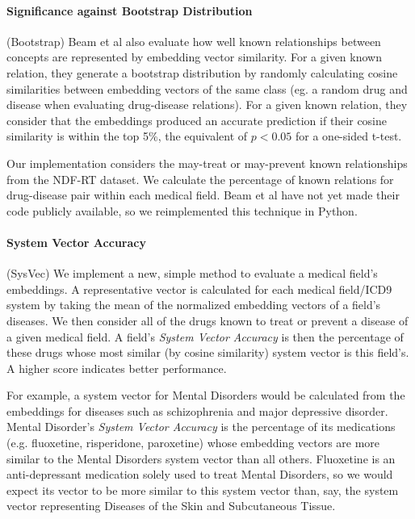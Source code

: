 \documentclass[11pt,a4paper]{article}
\begin{document}
\paragraph{Significance against Bootstrap Distribution}(Bootstrap)
Beam et al  also evaluate how well known relationships between concepts are represented by embedding vector similarity. For a given known relation, they generate a bootstrap distribution by randomly calculating cosine similarities between embedding vectors of the same class (eg. a random drug and disease when evaluating  drug-disease relations). For a given known relation, they consider that the embeddings produced an accurate prediction if their cosine similarity is within the top 5\%, the equivalent of $p<0.05$ for a one-sided t-test. 

Our implementation considers the may-treat or may-prevent known relationships from the NDF-RT dataset. We calculate the percentage of known relations for drug-disease pair within each medical field. Beam et al have not yet made their code publicly available, so we reimplemented this technique in Python. 

\paragraph{System Vector Accuracy}(SysVec)
We implement a new, simple method to evaluate a medical field's embeddings. A representative vector is calculated for each medical field/ICD9 system by taking the mean of the normalized embedding vectors of a field's diseases. We then consider all of the drugs known to treat or prevent a disease of a given medical field. A field's \emph{System Vector Accuracy} is then the percentage of these drugs whose most similar (by cosine similarity) system vector is this field's. A higher score indicates better performance.

For example, a system vector for Mental Disorders would be calculated from the embeddings for diseases such as schizophrenia and major depressive disorder. Mental Disorder's \emph{System Vector Accuracy} is the percentage of its medications (e.g. fluoxetine, risperidone, paroxetine) whose embedding vectors are more similar to the Mental Disorders system vector than all others. Fluoxetine is an anti-depressant medication solely used to treat Mental Disorders, so we would expect its vector to be more similar to this system vector than, say, the system vector representing Diseases of the Skin and Subcutaneous Tissue. 
\end{document}
